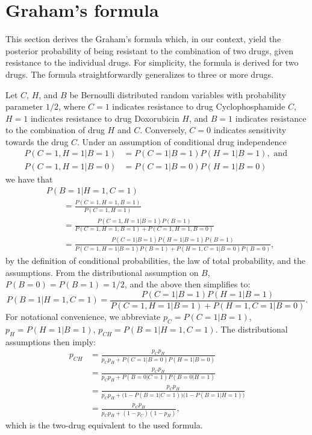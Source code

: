 \documentclass{article}
\begin{document}




\clearpage



\section{Graham's formula}
\label{sec:graham}
This section derives the Graham's formula which, in our context, yield the posterior probability of being resistant to the combination of two drugs, given resistance to the individual drugs.
For simplicity, the formula is derived for two drugs.
The formula straightforwardly generalizes to three or more drugs.

Let $C$, $H$, and $B$ be Bernoulli distributed random variables with probability parameter $1/2$, where
$C = 1$ indicates resistance to drug Cyclophosphamide $C$,
$H = 1$ indicates resistance to drug Doxorubicin $H$, and
$B = 1$ indicates resistance to the combination of drug $H$ and $C$.
Conversely, $C = 0$ indicates sensitivity towards the drug $C$.
Under an assumption of conditional drug independence
\begin{align*}
  P(C=1, H=1| B=1) &= P(C=1 | B=1) P(H=1 | B=1), \text{ and } \\
  P(C=1, H=1| B=0) &= P(C=1 | B=0) P(H=1 | B=0)
\end{align*}
we have that
\begin{align*}
  &P(B=1 | H=1, C=1)
  \\&\qquad
   = \frac{P(C=1, H=1, B=1)}
          {P(C=1, H=1)}
  \\&\qquad
   = \frac{P(C=1, H=1 | B=1) P(B=1)}
          {P(C=1, H=1, B=1) + P(C=1, H=1, B=0)}
  \\&\qquad
   = \frac{P(C=1 | B=1) P(H=1 | B=1) P(B=1)}
          {P(C=1, H=1 | B=1) P(B=1) + P(H=1, C=1| B=0) P(B=0)},
\end{align*}
by the definition of conditional probabilities, the law of total probability, and the assumptions.
From the distributional assumption on $B$, $P(B=0) = P(B=1) = 1/2$, and the above then simplifies to:
\begin{equation*}
  P(B=1 | H=1, C=1)
   = \frac{P(C=1 | B=1) P(H=1 | B=1)}
          {P(C=1, H=1 | B=1) + P(H=1, C=1 | B=0)}.
\end{equation*}
For notational convenience, we abbreviate
$p_C = P(C=1 | B=1)$,
$p_H = P(H=1 | B=1)$,
$p_{CH} = P(B=1 | H=1, C=1)$.
The distributional assumptions then imply:
\begin{align*}
  p_{CH}
  &= \frac{p_C p_H}
          {p_C p_H + P(C=1 | B=0) P(H=1 | B=0)}
  \\
  &= \frac{p_C p_H}
          {p_C p_H + P(B=0 | C=1) P(B=0 | H=1)}
  \\
  &= \frac{p_C p_H}
          {p_C p_H + \bigl(1 - P(B=1 | C=1)\bigr)\bigl(1 - P(B=1 | H=1)\bigr)}
  \\
  &= \frac{p_C p_H}
          {p_C p_H + (1 - p_C)(1 - p_H)},
\end{align*}
which is the two-drug equivalent to the used formula.
\end{document}
